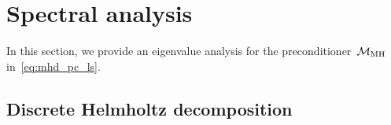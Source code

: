 \documentclass{siamltex}
\begin{document}
%


\section{Spectral analysis}
\label{sec:mhd_eigenvalue}

In this section, we provide an eigenvalue analysis for the preconditioner~$\mathcal{M}_{\rm MH}$ in~\eqref{eq:mhd_pc_ls}.

\subsection{Discrete Helmholtz decomposition}
\end{document}
